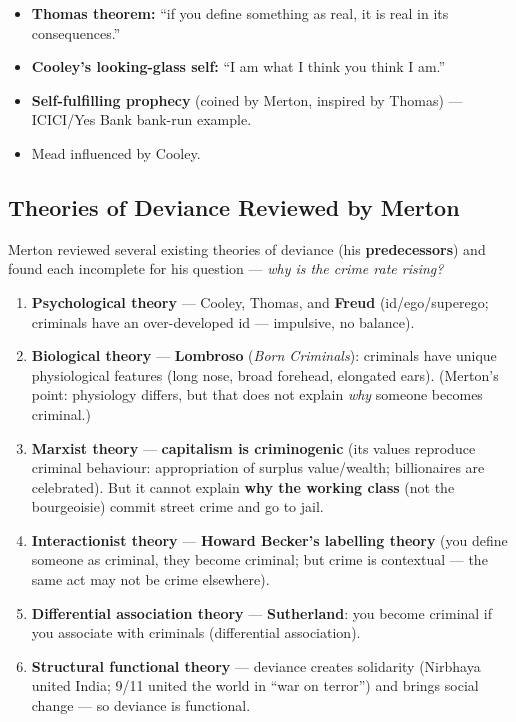 \begin{QuickRevision}
\begin{itemize}
\item \textbf{Thomas theorem:} ``if you define something as real, it is real in its consequences.''
\item \textbf{Cooley's looking-glass self:} ``I am what I think you think I am.''
\item \textbf{Self-fulfilling prophecy} (coined by Merton, inspired by Thomas) --- ICICI/Yes Bank bank-run example.
\item Mead influenced by Cooley.
\end{itemize}
\end{QuickRevision}

\sectiondivider

\subsection{Theories of Deviance Reviewed by Merton}

Merton reviewed several existing theories of deviance (his \textbf{predecessors}) and found each incomplete for his question --- \textit{why is the crime rate rising?}

\begin{enumerate}
\item \textbf{Psychological theory} --- Cooley, Thomas, and \textbf{Freud} (id/ego/superego; criminals have an over-developed id --- impulsive, no balance).
\item \textbf{Biological theory} --- \textbf{Lombroso} (\textit{Born Criminals}): criminals have unique physiological features (long nose, broad forehead, elongated ears). (Merton's point: physiology differs, but that does not explain \textit{why} someone becomes criminal.)
\item \textbf{Marxist theory} --- \textbf{capitalism is criminogenic} (its values reproduce criminal behaviour: appropriation of surplus value/wealth; billionaires are celebrated). But it cannot explain \textbf{why the working class} (not the bourgeoisie) commit street crime and go to jail.
\item \textbf{Interactionist theory} --- \textbf{Howard Becker's labelling theory} (you define someone as criminal, they become criminal; but crime is contextual --- the same act may not be crime elsewhere).
\item \textbf{Differential association theory} --- \textbf{Sutherland}: you become criminal if you associate with criminals (differential association).
\item \textbf{Structural functional theory} --- deviance creates solidarity (Nirbhaya united India; 9/11 united the world in ``war on terror'') and brings social change --- so deviance is functional.
\end{enumerate}

